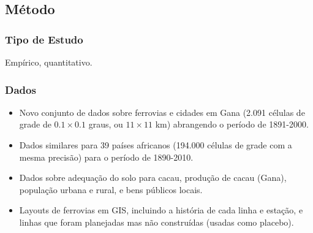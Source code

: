 \documentclass[12pt]{article}
\begin{document}
\subsection*{Método}

\subsubsection*{Tipo de Estudo}
Empírico, quantitativo.

\subsubsection*{Dados}
\begin{itemize}
    \item Novo conjunto de dados sobre ferrovias e cidades em Gana (2.091 células de grade de $0.1 \times 0.1$ graus, ou $11 \times 11$ km) abrangendo o período de 1891-2000.
    \item Dados similares para 39 países africanos (194.000 células de grade com a mesma precisão) para o período de 1890-2010.
    \item Dados sobre adequação do solo para cacau, produção de cacau (Gana), população urbana e rural, e bens públicos locais.
    \item Layouts de ferrovias em GIS, incluindo a história de cada linha e estação, e linhas que foram planejadas mas não construídas (usadas como placebo).
\end{itemize}
\end{document}
